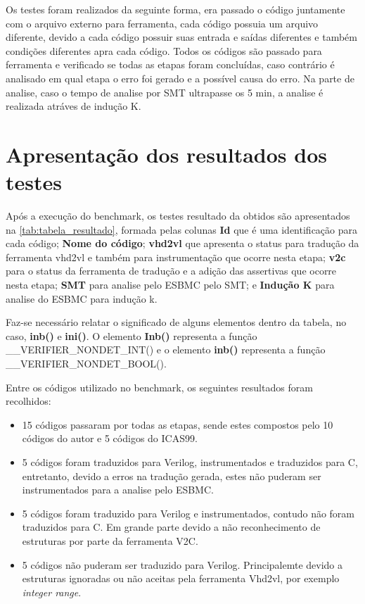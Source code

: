 \par
Os testes foram realizados da seguinte forma, era passado o código juntamente com o arquivo externo para ferramenta, cada código possuia um arquivo diferente, devido a cada código possuir suas entrada e saídas diferentes e também condições diferentes apra cada código. Todos os códigos são passado para ferramenta e verificado se todas as etapas foram concluídas, caso contrário é analisado em qual etapa o erro foi gerado e a possível causa do erro. Na parte de analise, caso o tempo de analise por SMT ultrapasse os 5 min, a analise é realizada atráves de indução K.
\section{Apresentação dos resultados dos testes}
Após a execução do benchmark, os testes resultado da obtidos são apresentados na \autoref{tab:tabela_resultado}, formada pelas colunas \textbf{Id} que é uma identificação para cada código; \textbf{Nome do código}; \textbf{vhd2vl} que apresenta o status para tradução da ferramenta vhd2vl e também para instrumentação que ocorre nesta etapa; \textbf{v2c} para o status da ferramenta de tradução e a adição das assertivas que ocorre nesta etapa; \textbf{SMT} para analise pelo ESBMC pelo SMT; e \textbf{Indução K} para analise do ESBMC para indução k.

\par
Faz-se necessário relatar o significado de alguns elementos dentro da tabela, no caso, \textbf{inb()} e \textbf{ini()}. O elemento \textbf{Inb()} representa a função \_\_VERIFIER\_NONDET\_INT() e o elemento \textbf{inb()} representa a função \_\_VERIFIER\_NONDET\_BOOL().

\par
Entre os códigos utilizado no benchmark, os seguintes resultados foram recolhidos:
\begin{itemize}
    \item 15 códigos passaram por todas as etapas, sende estes compostos pelo 10 códigos do autor e 5 códigos do ICAS99.
    \item 5 códigos foram traduzidos para Verilog, instrumentados e traduzidos para C, entretanto, devido a erros na tradução gerada, estes não puderam ser instrumentados para a analise pelo ESBMC.
    \item 5 códigos foram traduzido para Verilog e instrumentados, contudo não foram traduzidos para C. Em grande parte devido a não reconhecimento de estruturas por parte da ferramenta V2C.
    \item 5 códigos não puderam ser traduzido para Verilog. Principalemte devido a estruturas ignoradas ou não aceitas pela ferramenta Vhd2vl, por exemplo \textit{integer range}.
\end{itemize}

